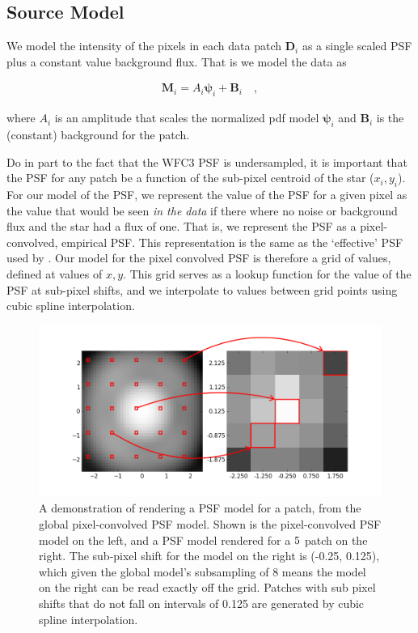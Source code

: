 \documentclass[12pt,letterpaper,preprint]{aastex}
\newcommand{\vect}[1]{\mathbf{#1}}
\newcommand{\data}{\vect{D}}
\newcommand{\model}{\vect{M}}
\newcommand{\bkg}{\vect{B}}
\newcommand{\psf}{\vect{\psi}}
\begin{document}
\subsection{Source Model}
\label{ssec:model}

We model the intensity of the pixels in each data patch $\data_i$ as a single scaled PSF plus a constant value 
background flux.  That is we model the data as 

\begin{eqnarray}
\model_i =  A_i \psf_i + \bkg_i
\quad , 
\label{eqn:model-patch}
\end{eqnarray}

\noindent where $A_i$ is an amplitude that scales the normalized pdf model $\psf_i$ and $\bkg_i$ is 
the (constant) background for the patch.  

Do in part to the fact that the WFC3 PSF is undersampled,  it 
is important that the PSF for any patch be a function of the sub-pixel centroid of the star ($x_i, y_i$).  For 
our model of the PSF, we represent the value of the PSF for a given pixel as the value that would be 
seen \emph{in the data} if there where no noise or background flux and the star had a flux of one.  That 
is, we represent the PSF as a pixel-convolved, empirical PSF.  This representation is the same as the
 `effective' PSF used by \citet{anderson06}.  Our model for the pixel convolved PSF is therefore a grid 
 of values, defined at values of $x, y$.  This grid serves as a lookup function for the value of the PSF 
 at sub-pixel shifts, and we interpolate to values between grid points using cubic spline interpolation.

\begin{figure}
\centering
 \includegraphics[clip=true, trim=0cm 0cm 0.0cm 0.cm,width=16cm]{../plots/paper_figs/fig2.png}
\caption{A demonstration of rendering a PSF model for a patch, from the global pixel-convolved PSF 
model.  Shown is the pixel-convolved PSF model on the left, and a PSF model rendered for a $5\time5$
patch on the right.  The sub-pixel shift for the model on the right is (-0.25, 0.125), which given the global 
model's subsampling of 8 means the model on the right can be read exactly off the grid.  Patches with 
sub pixel shifts that do not fall on intervals of 0.125 are generated by cubic spline interpolation.}
\label{fig:psf-generation}
\end{figure}
\end{document}
